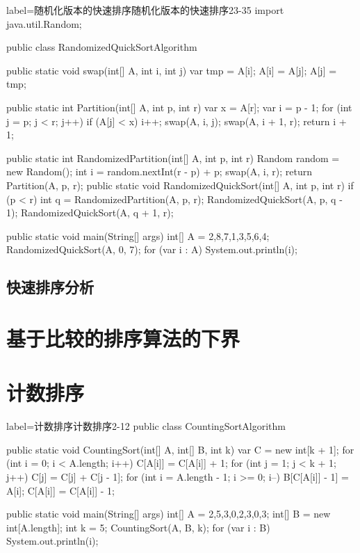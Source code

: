 \documentclass[oneside,10pt,fontset=none]{ctexbook}
\numberwithin{definition}{chapter}
\numberwithin{theorem}{chapter}
\numberwithin{lemma}{chapter}
\begin{document}
\begin{myjava}{label={随机化版本的快速排序}}{随机化版本的快速排序}{23-35}
import java.util.Random;

public class RandomizedQuickSortAlgorithm {
    public static void swap(int[] A, int i, int j) {
        var tmp = A[i];
        A[i] = A[j];
        A[j] = tmp;
    }

    public static int Partition(int[] A, int p, int r) {
        var x = A[r];
        var i = p - 1;
        for (int j = p; j < r; j++) {
            if (A[j] < x) {
                i++;
                swap(A, i, j);
            }
        }
        swap(A, i + 1, r);
        return i + 1;
    }

    public static int RandomizedPartition(int[] A, int p, int r) {
        Random random = new Random();
        int i = random.nextInt(r - p) + p;
        swap(A, i, r);
        return Partition(A, p, r);
    }
    public static void RandomizedQuickSort(int[] A, int p, int r) {
        if (p < r) {
            int q = RandomizedPartition(A, p, r);
            RandomizedQuickSort(A, p, q - 1);
            RandomizedQuickSort(A, q + 1, r);
        }
    }

    public static void main(String[] args) {
        int[] A = {2,8,7,1,3,5,6,4};
        RandomizedQuickSort(A, 0, 7);
        for (var i : A)
            System.out.println(i);
    }
}
\end{myjava}

\section{快速排序分析}

\chapter{基于比较的排序算法的下界}

\chapter{计数排序}

\begin{myjava}{label={计数排序}}{计数排序}{2-12}
public class CountingSortAlgorithm {
    public static void CountingSort(int[] A, int[] B, int k) {
        var C = new int[k + 1];
        for (int i = 0; i < A.length; i++)
            C[A[i]] = C[A[i]] + 1;
        for (int j = 1; j < k + 1; j++)
            C[j] = C[j] + C[j - 1];
        for (int i = A.length - 1; i >= 0; i--) {
            B[C[A[i]] - 1] = A[i];
            C[A[i]] = C[A[i]] - 1;
        }
    }

    public static void main(String[] args) {
        int[] A = {2,5,3,0,2,3,0,3};
        int[] B = new int[A.length];
        int k = 5;
        CountingSort(A, B, k);
        for (var i : B)
            System.out.println(i);
    }
}
\end{myjava}
\end{document}
